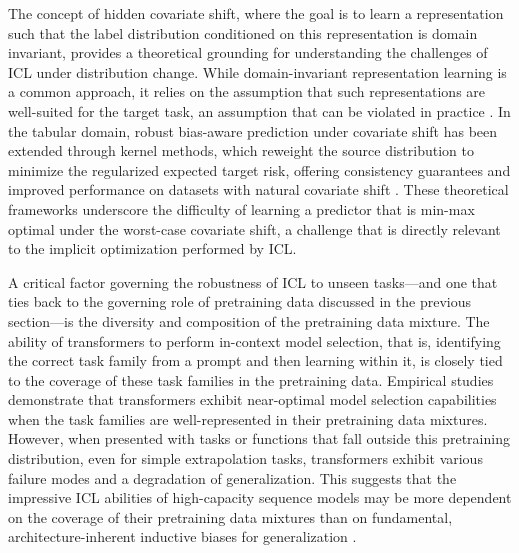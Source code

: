 \documentclass[11pt]{article}
\begin{document}
The concept of hidden covariate shift, where the goal is to learn a representation such that the label distribution conditioned on this representation is domain invariant, provides a theoretical grounding for understanding the challenges of ICL under distribution change. While domain-invariant representation learning is a common approach, it relies on the assumption that such representations are well-suited for the target task, an assumption that can be violated in practice \cite{ref115}. In the tabular domain, robust bias-aware prediction under covariate shift has been extended through kernel methods, which reweight the source distribution to minimize the regularized expected target risk, offering consistency guarantees and improved performance on datasets with natural covariate shift \cite{ref116}. These theoretical frameworks underscore the difficulty of learning a predictor that is min-max optimal under the worst-case covariate shift, a challenge that is directly relevant to the implicit optimization performed by ICL.

A critical factor governing the robustness of ICL to unseen tasks---and one that ties back to the governing role of pretraining data discussed in the previous section---is the diversity and composition of the pretraining data mixture. The ability of transformers to perform in-context model selection, that is, identifying the correct task family from a prompt and then learning within it, is closely tied to the coverage of these task families in the pretraining data. Empirical studies demonstrate that transformers exhibit near-optimal model selection capabilities when the task families are well-represented in their pretraining data mixtures. However, when presented with tasks or functions that fall outside this pretraining distribution, even for simple extrapolation tasks, transformers exhibit various failure modes and a degradation of generalization. This suggests that the impressive ICL abilities of high-capacity sequence models may be more dependent on the coverage of their pretraining data mixtures than on fundamental, architecture-inherent inductive biases for generalization \cite{ref117}.
\end{document}
